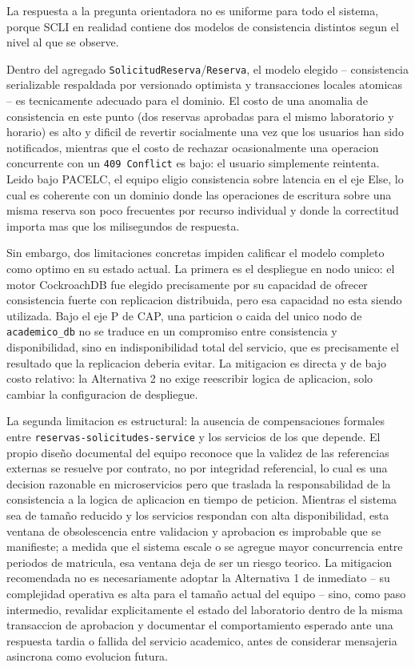 \documentclass[11pt,a4paper]{article}
\begin{document}
La respuesta a la pregunta orientadora no es uniforme para todo el sistema, porque SCLI en realidad contiene dos modelos de consistencia distintos segun el nivel al que se observe.

Dentro del agregado \texttt{SolicitudReserva}/\texttt{Reserva}, el modelo elegido -- consistencia serializable respaldada por versionado optimista y transacciones locales atomicas -- es tecnicamente adecuado para el dominio. El costo de una anomalia de consistencia en este punto (dos reservas aprobadas para el mismo laboratorio y horario) es alto y dificil de revertir socialmente una vez que los usuarios han sido notificados, mientras que el costo de rechazar ocasionalmente una operacion concurrente con un \texttt{409 Conflict} es bajo: el usuario simplemente reintenta. Leido bajo PACELC, el equipo eligio consistencia sobre latencia en el eje Else, lo cual es coherente con un dominio donde las operaciones de escritura sobre una misma reserva son poco frecuentes por recurso individual y donde la correctitud importa mas que los milisegundos de respuesta.

Sin embargo, dos limitaciones concretas impiden calificar el modelo completo como optimo en su estado actual. La primera es el despliegue en nodo unico: el motor CockroachDB fue elegido precisamente por su capacidad de ofrecer consistencia fuerte con replicacion distribuida, pero esa capacidad no esta siendo utilizada. Bajo el eje P de CAP, una particion o caida del unico nodo de \texttt{academico\_db} no se traduce en un compromiso entre consistencia y disponibilidad, sino en indisponibilidad total del servicio, que es precisamente el resultado que la replicacion deberia evitar. La mitigacion es directa y de bajo costo relativo: la Alternativa 2 no exige reescribir logica de aplicacion, solo cambiar la configuracion de despliegue.

La segunda limitacion es estructural: la ausencia de compensaciones formales entre \texttt{reservas-solicitudes-service} y los servicios de los que depende. El propio diseño documental del equipo reconoce que la validez de las referencias externas se resuelve por contrato, no por integridad referencial, lo cual es una decision razonable en microservicios pero que traslada la responsabilidad de la consistencia a la logica de aplicacion en tiempo de peticion. Mientras el sistema sea de tamaño reducido y los servicios respondan con alta disponibilidad, esta ventana de obsolescencia entre validacion y aprobacion es improbable que se manifieste; a medida que el sistema escale o se agregue mayor concurrencia entre periodos de matricula, esa ventana deja de ser un riesgo teorico. La mitigacion recomendada no es necesariamente adoptar la Alternativa 1 de inmediato -- su complejidad operativa es alta para el tamaño actual del equipo -- sino, como paso intermedio, revalidar explicitamente el estado del laboratorio dentro de la misma transaccion de aprobacion y documentar el comportamiento esperado ante una respuesta tardia o fallida del servicio academico, antes de considerar mensajeria asincrona como evolucion futura.
\end{document}
